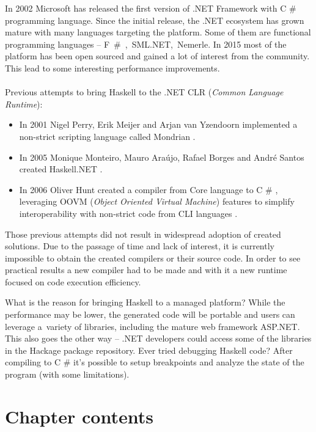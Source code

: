 \documentclass[en]{pracamgr}
\newcommand{\shrp}{%
  {\fontfamily{ppl}\selectfont\#%
  }}
\begin{document}
In 2002 Microsoft has released the first version of .NET Framework with
C\shrp{} programming language. Since the initial release, the .NET ecosystem
has grown mature with many languages targeting the platform. 
Some of them are functional programming languages -- \mbox{F\shrp{}, SML.NET, Nemerle}.
In 2015 most of the platform has been open sourced and gained a lot of
interest from the community. This lead to some interesting performance
improvements.\\ \\
Previous attempts to bring
Haskell to the .NET CLR (\textit{Common Language Runtime}):
\begin{itemize}
  \item
  In 2001 Nigel Perry, Erik Meijer and Arjan van Yzendoorn implemented a 
  non-strict scripting language called Mondrian
  \cite{MondrianImplDetails}\cite{PerryMeijer}.
  
  \item
  In 2005 Monique Monteiro, Mauro Ara\'ujo, Rafael Borges and Andr\'e Santos
  created Haskell.NET
  \cite{Brazil}.

  \item
  In 2006 Oliver Hunt created a compiler from Core language to C\shrp{}, leveraging
  OOVM (\textit{Object Oriented Virtual Machine}) features to simplify interoperability
  with non-strict code from CLI languages \cite{Hunt}.
\end{itemize}

Those previous attempts did not result in widespread adoption of created solutions.
Due to the passage of time and lack of interest, it is currently impossible
to obtain the created compilers or their source code.
In order to see practical results a new compiler had to be made
and with it a new runtime focused on code execution efficiency.

\newpage
What is the reason for bringing Haskell to a managed platform?
While the performance may be lower, the generated code will be portable
and users can leverage a~variety of libraries, including the mature web framework
ASP.NET. This also goes the other way -- .NET developers could access some of
the libraries in the Hackage package repository.
Ever tried debugging Haskell code? After compiling to C\shrp{} it's possible
to setup breakpoints and analyze the state of the program (with some limitations).

\section*{Chapter contents}
\end{document}
